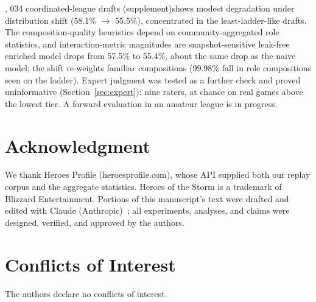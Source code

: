 \documentclass[journal]{IEEEtran}
\newif\ifanonymous
\providecommand{\DIFaddtex}[1]{{\protect\color{blue} \sf #1}} %
\providecommand{\DIFdeltex}[1]{{\protect\color{red} \scriptsize #1}} %
\providecommand{\DIFaddbegin}{} %
\providecommand{\DIFaddend}{} %
\providecommand{\DIFdelend}{} %
\providecommand{\DIFadd}[1]{\texorpdfstring{\DIFaddtex{#1}}{#1}} %
\providecommand{\DIFdel}[1]{\texorpdfstring{\DIFdeltex{#1}}{}} %
\begin{document}
\DIFdel{,}%
\DIFdel{034 coordinated-league drafts (supplement)shows modest degradation under distribution shift (58.1\% $\to$ 55.5\%), concentrated in the least-ladder-like drafts. The composition-quality heuristics depend on community-aggregated role statistics, and interaction-metric magnitudes are snapshot-sensitive}\DIFdelend \DIFaddbegin \DIFadd{leak-free enriched model drops from 57.5\% to 55.4\%, about the same drop as the naive model; the shift re-weights familiar compositions (99.98\% fall in role compositions seen on the ladder)}\DIFaddend . \DIFaddbegin \DIFadd{Expert judgment was tested as a further check and proved uninformative (Section~\ref{sec:expert}): nine raters, at chance on real games above the lowest tier. A forward evaluation in an amateur league is in progress.
}\DIFaddend 

\ifanonymous
\section*{AI Disclosure}

Portions of this manuscript's text were drafted and edited with Claude (Anthropic)~\cite{claude}; all experiments, analyses, and claims were designed, verified, and approved by the authors.
\else
\section*{Acknowledgment}

We thank Heroes Profile (heroesprofile.com), whose API supplied both our replay corpus and the aggregate statistics. Heroes of the Storm is a trademark of Blizzard Entertainment. Portions of this manuscript's text were drafted and edited with Claude (Anthropic)~\cite{claude}; all experiments, analyses, and claims were designed, verified, and approved by the authors.
\fi

\section*{Conflicts of Interest}

The authors declare no conflicts of interest.
\end{document}

